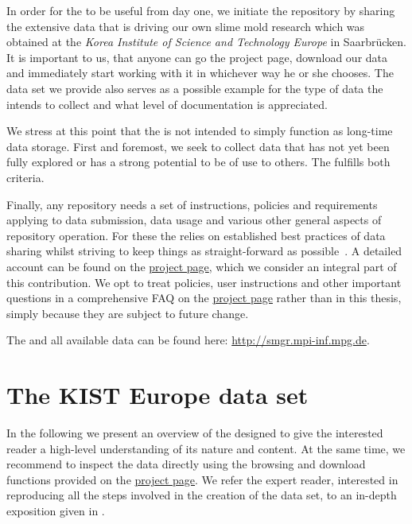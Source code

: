  	In order for the \SMGR to be useful from day one, we initiate the repository by sharing the extensive data that is driving our own slime mold research which was obtained at the \emph{Korea Institute of Science and Technology Europe} in Saarbr\"ucken. It is important to us, that anyone can go the \SMGR project page, download our data and immediately start working with it in whichever way he or she chooses. The data set we provide also serves as a possible example for the type of data the \SMGR intends to collect and what level of documentation is appreciated. 

 	We stress at this point that the \SMGR is not intended to simply function as long-time data storage. First and foremost, we seek to collect data that has not yet been fully explored or has a strong potential to be of use to others. The \data fulfills both criteria.

	Finally, any repository needs a set of instructions, policies and requirements applying to data submission, data usage and various other general aspects of repository operation. For these the \SMGR relies on established best practices of data sharing whilst striving to keep things as straight-forward as possible~\cite{white2013nine}. A detailed account can be found on the \href{http://smgr.mpi-inf.mpg.de}{\SMGR project page}, which we consider an integral part of this contribution. We opt to treat policies, user instructions and other important questions in a comprehensive FAQ on the \href{http://smgr.mpi-inf.mpg.de}{\SMGR project page} rather than in this thesis, simply because they are subject to future change.

	The \SMGR and all available data can be found here: \href{http://smgr.mpi-inf.mpg.de}{http://smgr.mpi-inf.mpg.de}. 

\section{The KIST Europe data set}	

	In the following we present an overview of the \data designed to give the interested reader a high-level understanding of its nature and content. At the same time, we recommend to inspect the data directly using the browsing and download functions provided on the \href{http://smgr.mpi-inf.mpg.de}{\SMGR project page}. We refer the expert reader, interested in reproducing all the steps involved in the creation of the data set, to an in-depth exposition given in .

